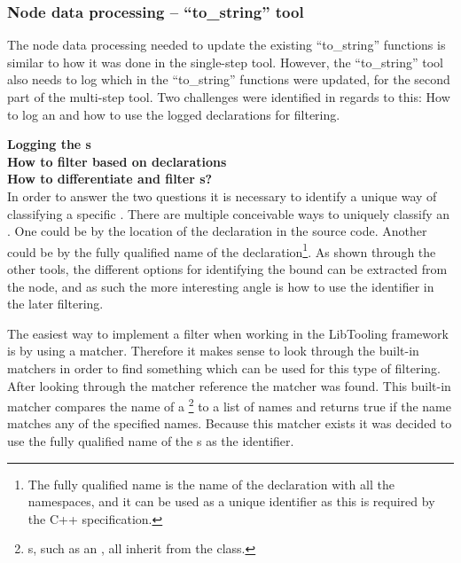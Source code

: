 \subsubsection*{Node data processing -- ``to\_string'' tool}
The node data processing needed to update the existing ``to\_string'' functions is similar to how it was done in the single-step tool.
However, the ``to\_string'' tool also needs to log which  in the ``to\_string'' functions were updated, for the second part of the multi-step tool.
Two challenges were identified in regards to this: How to log an  and how to use the logged declarations for filtering.


\textbf{Logging the s}\\

\textbf{How to filter based on declarations}\\

\textbf{How to differentiate and filter s?}\\
In order to answer the two questions it is necessary to identify a unique way of classifying a specific . There are multiple conceivable ways to uniquely classify an . One could be by the location of the declaration in the source code. Another could be by the fully qualified name of the declaration\footnote{The fully qualified name is the name of the declaration with all the namespaces, and it can be used as a unique identifier as this is required by the C++ specification.}. As shown through the other tools, the different options for identifying the bound  can be extracted from the node, and as such the more interesting angle is how to use the identifier in the later filtering.

The easiest way to implement a filter when working in the LibTooling framework is by using a matcher. Therefore it makes sense to look through the built-in matchers in order to find something which can be used for this type of filtering. After looking through the matcher reference the  matcher was found. This built-in matcher compares the name of a \footnote{s, such as an , all inherit from the  class.} to a list of names and returns true if the name matches any of the specified names. Because this matcher exists it was decided to use the fully qualified name of the s as the identifier.

